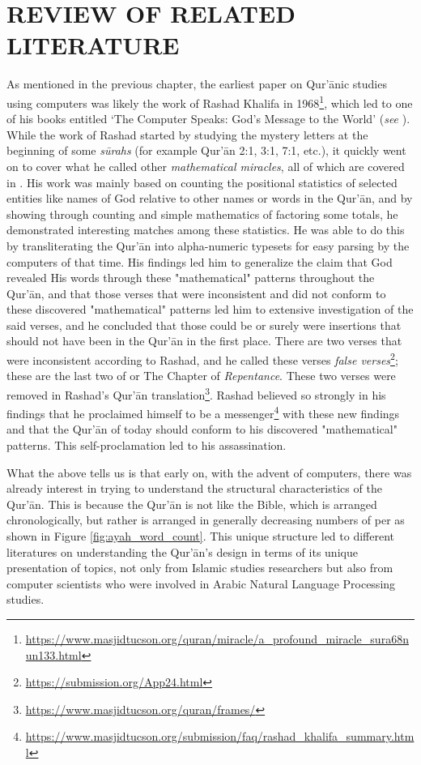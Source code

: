 \chapter{REVIEW OF RELATED LITERATURE}\label{ch:rrl}

As mentioned in the previous chapter, the earliest paper on Qur'\=anic studies using computers was likely the work of Rashad Khalifa in 1968\footnote{\url{https://www.masjidtucson.org/quran/miracle/a_profound_miracle_sura68nun133.html}}, which led to one of his books entitled `The Computer Speaks: God's Message to the World' (\textit{see} ). While the work of Rashad started by studying the mystery letters at the beginning of some \textit{s\=urahs}  (for example Qur'\=an 2:1, 3:1, 7:1, etc.), it quickly went on to cover what he called other \textit{mathematical miracles}, all of which are covered in . His work was mainly based on counting the positional statistics of selected entities like names of God relative to other names or words in the Qur'\=an, and by showing through counting and simple mathematics of factoring some totals, he demonstrated interesting matches among these statistics. He was able to do this by transliterating the Qur'\=an into alpha-numeric typesets for easy parsing by the computers of that time. His findings led him to generalize the claim that God revealed His words through these "mathematical" patterns throughout the Qur'\=an, and that those verses that were inconsistent and did not conform to these discovered "mathematical" patterns led him to extensive investigation of the said verses, and he concluded that those could be or surely were insertions that should not have been in the Qur'\=an in the first place. There are two verses that were inconsistent according to Rashad, and he called these verses \textit{false verses}\footnote{\url{https://submission.org/App24.html}}; these are the last two   of   or The Chapter of \textit{Repentance}. These two verses were removed in Rashad's Qur'\=an translation\footnote{\url{https://www.masjidtucson.org/quran/frames/}}. Rashad believed so strongly in his findings that he proclaimed himself to be a messenger\footnote{\url{https://www.masjidtucson.org/submission/faq/rashad_khalifa_summary.html}} with these new findings and that the Qur'\=an of today should conform to his discovered "mathematical" patterns. This self-proclamation led to his assassination.

What the above tells us is that early on, with the advent of computers, there was already interest in trying to understand the structural characteristics of the Qur'\=an. This is because the Qur'\=an is not like the Bible, which is arranged chronologically, but rather is arranged in generally decreasing numbers of   per   as shown in Figure \ref{fig:ayah_word_count}. This unique structure led to different literatures on understanding the Qur'\=an's design in terms of its unique presentation of topics, not only from Islamic studies researchers but also from computer scientists who were involved in Arabic Natural Language Processing studies. 

